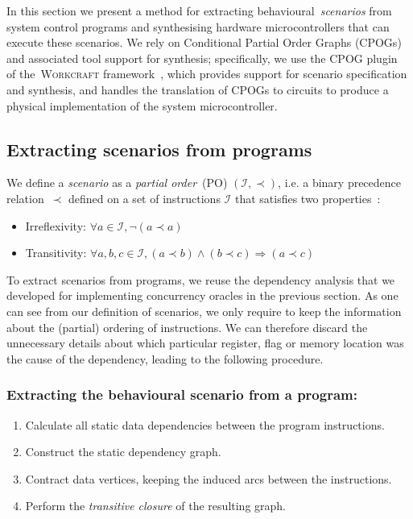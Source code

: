 In this section we present a method for extracting behavioural~\emph{scenarios}
from system control programs and synthesising hardware microcontrollers that can
execute these scenarios. We rely on Conditional Partial Order Graphs
(CPOGs)~\cite{CPOG} and associated tool support for synthesis; specifically, we
use the CPOG plugin~\cite{scenco-tool} of the~\textsc{Workcraft}
framework~\cite{workcraft-tool}, which provides support for scenario
specification and synthesis, and handles the translation of CPOGs to circuits
to produce a physical implementation of the system microcontroller.

\subsection{Extracting scenarios from programs}

We define a \textit{scenario} as a \textit{partial order}~(PO)
$(\mathcal{I},\prec)$, i.e. a binary precedence relation~$\prec$ defined on a
set of instructions $\mathcal{I}$ that satisfies two properties~\cite{PO}:

\begin{itemize}
    \item Irreflexivity: $\forall a \in \mathcal{I}, \neg(a \prec a)$
    \vspace{+1mm}
    \item Transitivity: $\forall a, b, c \in \mathcal{I}, (a \prec b) \wedge (b
    \prec c) \Rightarrow (a \prec c)$
\end{itemize}

To extract scenarios from programs, we reuse the dependency analysis that we
developed for implementing concurrency oracles in the previous section. As one
can see from our definition of scenarios, we only require to keep the
information about the (partial) ordering of instructions. We can therefore
discard the unnecessary details about which particular register, flag or memory
location was the cause of the dependency, leading to the following procedure.

\vspace{-5mm}
\subsubsection{Extracting the behavioural scenario from a program:}
\begin{enumerate}
\vspace{-2mm}
    \item Calculate all static data dependencies between the program instructions.
    \item Construct the static dependency graph.
    \item Contract data vertices, keeping the induced arcs between the instructions.
    \item Perform the \emph{transitive closure} of the resulting graph.
\end{enumerate}


